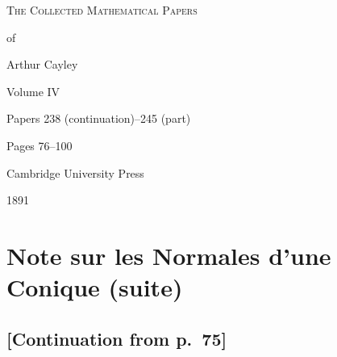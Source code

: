 \documentclass[11pt,a4paper]{article}
\begin{document}
\thispagestyle{empty}
\begin{center}
\vspace*{2cm}
{\Huge\scshape The Collected Mathematical Papers\par\vspace{0.3em} of\par\vspace{0.5em} Arthur Cayley\par\vspace{1.5em}}
{\LARGE Volume IV\par\vspace{1em}}
{\large Papers 238 (continuation)--245 (part)\par\vspace{0.5em}}
{\large Pages 76--100\par\vspace{2em}}
\vfill
{\large Cambridge University Press\par\vspace{0.3em}}
{\normalsize 1891}
\end{center}
\newpage

\tableofcontents
\newpage

\setcounter{page}{76}


\section*{Note sur les Normales d'une Conique (suite)}
\label{paper:238cont}

\subsection*{[Continuation from p.~75]}

\end{document}
